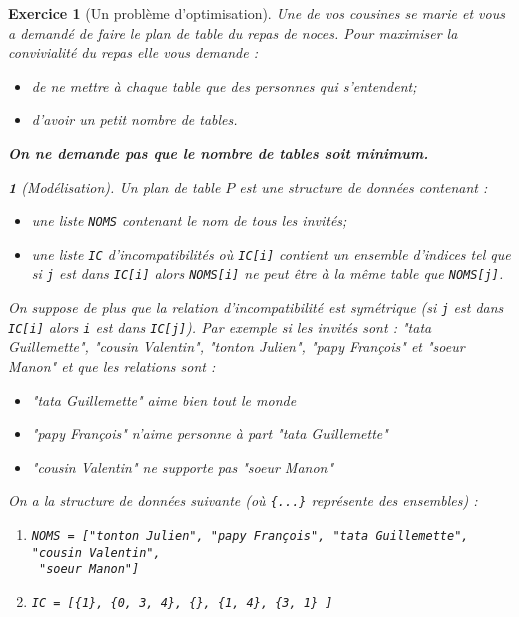 \documentclass{article}
\theoremstyle{exostyle}
\newtheorem{exo}{Exercice}
\theoremstyle{partiestyle}
\newtheorem{partie}{}[exo]
\theoremstyle{questionstyle}
\begin{document}
\begin{exo}[Un problème d'optimisation]

Une de vos cousines se marie et vous a demandé de faire le plan de table du repas de noces. Pour maximiser la convivialité du repas elle vous demande :

\begin{itemize}
\item de ne mettre à chaque table que des personnes qui s'entendent;
\item d'avoir un petit nombre de tables.
\end{itemize}

\begin{center}
{\bf On ne demande pas que le nombre de tables soit minimum.}
\end{center}

\begin{partie}[Modélisation]

Un plan de table $P$ est une structure de données contenant :

\begin{itemize}
\item une liste \verb|NOMS| contenant le nom de tous les invités;
\item une liste \verb|IC| d'incompatibilités où \verb|IC[i]| contient un ensemble d'indices tel que si \verb|j| est dans \verb|IC[i]| alors \verb|NOMS[i]| ne peut être à la même table que \verb|NOMS[j]|.
\end{itemize}

On suppose de plus que la relation d'incompatibilité est symétrique (si \verb|j| est dans \verb|IC[i]| alors \verb|i| est dans \verb|IC[j]|). Par exemple si les invités sont : {\it "tata Guillemette"}, {\it "cousin Valentin"}, {\it "tonton Julien"}, {\it "papy François"} et {\it "soeur Manon"} et que les relations sont :
\begin{itemize}
    \item {\it "tata Guillemette"} aime bien tout le monde
    \item {\it "papy François"} n'aime personne à part {\it "tata Guillemette"}
    \item {\it "cousin Valentin"} ne supporte pas {\it "soeur Manon"}
\end{itemize}

On a la structure de données suivante (où \verb|{...}| représente des ensembles) :

\begin{enumerate}
\item \verb|NOMS = ["tonton Julien", "papy François", "tata Guillemette", "cousin Valentin",| 
 \\ \verb| "soeur Manon"]|
\item \verb|IC = [{1}, {0, 3, 4}, {}, {1, 4}, {3, 1} ]|
\end{enumerate}


\end{partie}
\end{exo}
\end{document}
